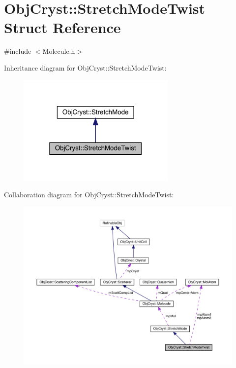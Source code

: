 \hypertarget{struct_obj_cryst_1_1_stretch_mode_twist}{}\section{Obj\+Cryst\+::Stretch\+Mode\+Twist Struct Reference}
\label{struct_obj_cryst_1_1_stretch_mode_twist}


{\ttfamily \#include $<$Molecule.\+h$>$}



Inheritance diagram for Obj\+Cryst\+::Stretch\+Mode\+Twist\+:
\nopagebreak
\begin{figure}[H]
\begin{center}
\leavevmode
\includegraphics[width=220pt]{struct_obj_cryst_1_1_stretch_mode_twist__inherit__graph}
\end{center}
\end{figure}


Collaboration diagram for Obj\+Cryst\+::Stretch\+Mode\+Twist\+:
\nopagebreak
\begin{figure}[H]
\begin{center}
\leavevmode
\includegraphics[width=350pt]{struct_obj_cryst_1_1_stretch_mode_twist__coll__graph}
\end{center}
\end{figure}
